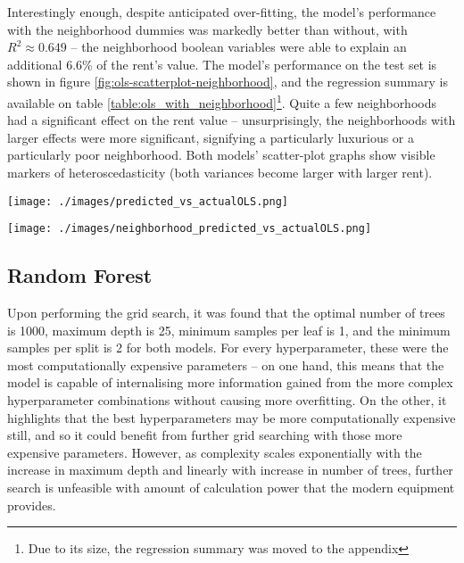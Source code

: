 \documentclass[12pt]{report}
\begin{document}
Interestingly enough, despite anticipated over-fitting, the model's performance with the neighborhood dummies was markedly better than without, with $R^2\approx0.649$ -- the neighborhood boolean variables were able to explain an additional 6.6\% of the rent's value. The model's performance on the test set is shown in figure \ref{fig:ols-scatterplot-neighborhood}, and the regression summary is available on table \ref{table:ols_with_neighborhood}\footnote{Due to its size, the regression summary was moved to the appendix}. Quite a few neighborhoods had a significant effect on the rent value -- unsurprisingly, the neighborhoods with larger effects were more significant, signifying a particularly luxurious or a particularly poor neighborhood. Both models' scatter-plot graphs show visible markers of heteroscedasticity (both variances become larger with larger rent).

\begin{minipage}{0.4778\textwidth}
	\centering
	\texttt{[image: ./images/predicted\_vs\_actualOLS.png]}
	\label{fig:ols-scatterplot}
\end{minipage}
\begin{minipage}{0.48\textwidth}
	\centering
	\texttt{[image: ./images/neighborhood\_predicted\_vs\_actualOLS.png]}
	\label{fig:ols-scatterplot-neighborhood}
\end{minipage}

\subsection{Random Forest}
Upon performing the grid search, it was found that the optimal number of trees is 1000, maximum depth is 25, minimum samples per leaf is 1, and the minimum samples per split is 2 for both models. For every hyperparameter, these were the most computationally expensive parameters -- on one hand, this means that the model is capable of internalising more information  gained from the more complex hyperparameter combinations without causing more overfitting. On the other, it highlights that the best hyperparameters may be more computationally expensive still, and so it could benefit from further grid searching with those more expensive parameters. However, as complexity scales exponentially with the increase in maximum depth and linearly with increase in number of trees, further search is unfeasible with amount of calculation power that the modern equipment provides.
\end{document}
